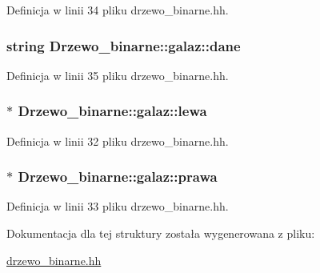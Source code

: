 \-Definicja w linii 34 pliku drzewo\-\_\-binarne.\-hh.

\hypertarget{struct_drzewo__binarne_1_1galaz_acb0e8aa37cf38024b7bb98aca46e7f55}{
\subsubsection[{dane}]{\setlength{\rightskip}{0pt plus 5cm}string {\bf \-Drzewo\-\_\-binarne\-::galaz\-::dane}}}\label{struct_drzewo__binarne_1_1galaz_acb0e8aa37cf38024b7bb98aca46e7f55}


\-Definicja w linii 35 pliku drzewo\-\_\-binarne.\-hh.

\hypertarget{struct_drzewo__binarne_1_1galaz_a7ed73bf073476a6b199013ba4caf9b5c}{
\subsubsection[{lewa}]{$\ast$ {\bf \-Drzewo\-\_\-binarne\-::galaz\-::lewa}}}\label{struct_drzewo__binarne_1_1galaz_a7ed73bf073476a6b199013ba4caf9b5c}


\-Definicja w linii 32 pliku drzewo\-\_\-binarne.\-hh.

\hypertarget{struct_drzewo__binarne_1_1galaz_a185391a82b9a9e74e34a35208f02feb2}{
\subsubsection[{prawa}]{$\ast$ {\bf \-Drzewo\-\_\-binarne\-::galaz\-::prawa}}}\label{struct_drzewo__binarne_1_1galaz_a185391a82b9a9e74e34a35208f02feb2}


\-Definicja w linii 33 pliku drzewo\-\_\-binarne.\-hh.



\-Dokumentacja dla tej struktury została wygenerowana z pliku\-:\begin{DoxyCompactItemize}
\item 
\hyperlink{drzewo__binarne_8hh}{drzewo\-\_\-binarne.\-hh}\end{DoxyCompactItemize}
